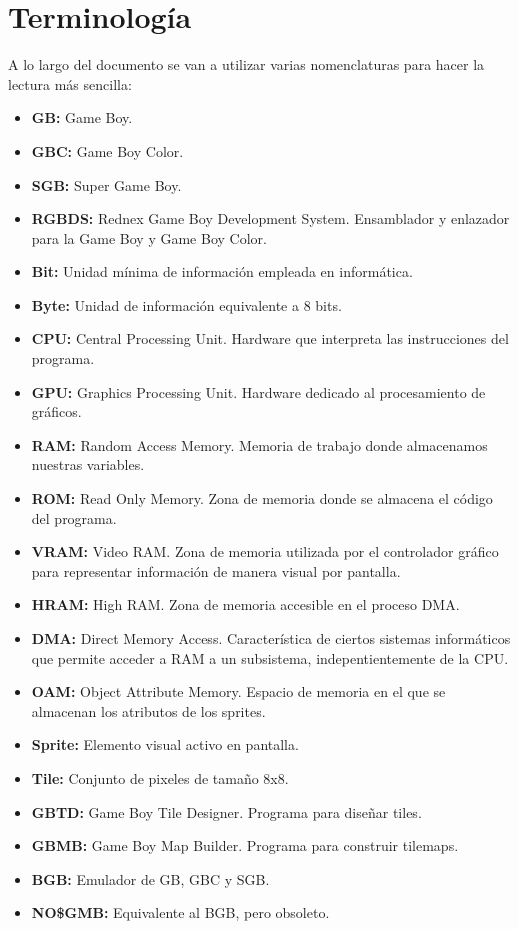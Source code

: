 \cleardoublepage

\chapter{Terminología}
\label{terminologia}
A lo largo del documento se van a utilizar varias nomenclaturas para hacer la lectura más sencilla:
\begin{itemize}
	\item \textbf{GB:} Game Boy.
    \item \textbf{GBC:} Game Boy Color.
    \item \textbf{SGB:} Super Game Boy.
	\item \textbf{RGBDS:} Rednex Game Boy Development System. Ensamblador y enlazador para la Game Boy y Game Boy Color.
	\item \textbf{Bit:} Unidad mínima de información empleada en informática.
	\item \textbf{Byte:} Unidad de información equivalente a 8 bits.
	\item \textbf{CPU:} Central Processing Unit. Hardware que interpreta las instrucciones del programa.
	\item \textbf{GPU:} Graphics Processing Unit. Hardware dedicado al procesamiento de gráficos.
	\item \textbf{RAM:} Random Access Memory. Memoria de trabajo donde almacenamos nuestras variables.
    \item \textbf{ROM:} Read Only Memory. Zona de memoria donde se almacena el código del programa.
	\item \textbf{VRAM:} Video RAM. Zona de memoria utilizada por el controlador gráfico para representar información de manera visual por pantalla.
	\item \textbf{HRAM:} High RAM. Zona de memoria accesible en el proceso DMA. 
    \item \textbf{DMA:} Direct Memory Access. Característica de ciertos sistemas informáticos que permite acceder a RAM a un subsistema, indepentientemente de la CPU.
    \item \textbf{OAM:} Object Attribute Memory. Espacio de memoria en el que se almacenan los atributos de los sprites.
    \item \textbf{Sprite:} Elemento visual activo en pantalla.
	\item \textbf{Tile:} Conjunto de pixeles de tamaño 8x8.
	\item \textbf{GBTD:} Game Boy Tile Designer. Programa para diseñar tiles.
	\item \textbf{GBMB:} Game Boy Map Builder. Programa para construir tilemaps.
	\item \textbf{BGB:} Emulador de GB, GBC y SGB.
	\item \textbf{NO\$GMB:} Equivalente al BGB, pero obsoleto.
\end{itemize}

